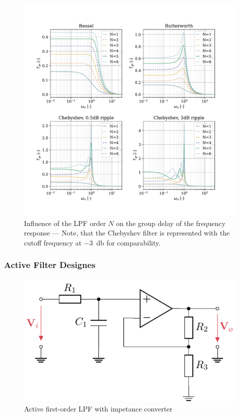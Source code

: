 \begin{figure}[!htb]
  \centering
  \includegraphics[scale=0.72]{figures/electronics/lowpass/lp_filter_grd}
  \caption[Influence of the \ac{LPF} order $N$ on the group delay of the frequency response]{Influence of the \ac{LPF} order $N$ on the group delay of the frequency response --- Note, that the Chebyshev filter is represented with the cutoff frequency at \SI{-3}{\decibel} for comparability.%
  \label{fig:lp_filter_grd}}
\end{figure}

\subsubsection{Active Filter Designes}
\begin{figure}[!htb]
  \centering
  \includegraphics[scale=1]{figures/electronics/lowpass/lp_active_1ord_imp_conv/lp_active_1ord_imp_conv}
  \caption[Active first-order \ac{LPF} with impetance converter]{Active first-order \ac{LPF} with impetance converter%
    \label{fig:lp_active_1ord_imp_conv}}
\end{figure}

